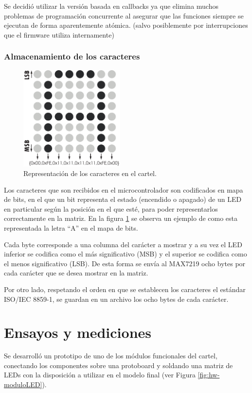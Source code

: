 Se decidió utilizar la versión basada en callbacks ya que elimina muchos problemas de programación concurrente al asegurar que las funciones siempre se ejecutan de forma aparentemente atómica. (salvo posiblemente por interrupciones que el firmware utiliza internamente)

\subsubsection{Almacenamiento de los caracteres}
\begin{figure}
    \centering
    \includegraphics[width=0.47\textwidth]{imagenes/codificacionAscii.pdf}
    \caption{Representación de los caracteres en el cartel.}
    \label{fig:repAscii}
\end{figure}


Los caracteres que son recibidos en el microcontrolador son codificados en mapa de bits, en el que un bit representa el estado (encendido o apagado) de un LED en particular según la posición en el que esté, para poder representarlos correctamente en la matriz. En la figura \ref{fig:repAscii} se observa un ejemplo de como esta representada la letra \enquote{A} en el mapa de bits.

Cada byte corresponde a una columna del carácter a mostrar y a su vez el LED inferior se codifica como el más significativo (MSB) y el superior se codifica como el menos significativo (LSB). De esta forma se envía al MAX7219 ocho bytes por cada carácter que se desea mostrar en la matriz.

Por otro lado, respetando el orden en que se establecen los caracteres el estándar ISO/IEC 8859-1, se guardan en un archivo los ocho bytes de cada carácter.

\section{Ensayos y mediciones}
Se desarrolló un prototipo de uno de los módulos funcionales del cartel, conectando los componentes sobre una protoboard y soldando una matriz de LEDs con la disposición a utilizar en el modelo final (ver Figura \ref{fig:hw-moduloLED}).

